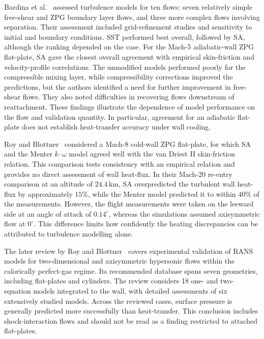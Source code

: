 Bardina et al.~\cite{bardina1997turbulence} assessed turbulence models for ten flows: seven relatively simple free-shear and ZPG boundary layer flows, and three more complex flows involving separation. Their assessment included grid-refinement studies and sensitivity to initial and boundary conditions. SST performed best overall, followed by SA, although the ranking depended on the case. For the Mach-5 adiabatic-wall ZPG flat-plate, SA gave the closest overall agreement with empirical skin-friction and velocity-profile correlations. The unmodified models performed poorly for the compressible mixing layer, while compressibility corrections improved the predictions, but the authors identified a need for further improvement in free-shear flows. They also noted difficulties in recovering flows downstream of reattachment. These findings illustrate the dependence of model performance on the flow and validation quantity. In particular, agreement for an adiabatic flat-plate does not establish heat-transfer accuracy under wall cooling.
\par\medskip

Roy and Blottner~\cite{roy2001assessment} considered a Mach-8 cold-wall ZPG flat-plate, for which SA and the Menter \(k\)--\(\omega\) model agreed well with the van Driest II skin-friction relation. This comparison tests consistency with an empirical relation and provides no direct assessment of wall heat-flux. In their Mach-20 re-entry comparison at an altitude of \(24.4\,\mathrm{km}\), SA overpredicted the turbulent wall heat-flux by approximately \(15\%\), while the Menter model predicted it to within \(40\%\) of the measurements. However, the flight measurements were taken on the leeward side at an angle of attack of \(0.14^\circ\), whereas the simulations assumed axisymmetric flow at \(0^\circ\). This difference limits how confidently the heating discrepancies can be attributed to turbulence modelling alone.
\par\medskip

The later review by Roy and Blottner~\cite{roy2006review} covers experimental validation of RANS models for two-dimensional and axisymmetric hypersonic flows within the calorically perfect-gas regime. Its recommended database spans seven geometries, including flat-plates and cylinders. The review considers 18 one- and two-equation models integrated to the wall, with detailed assessments of six extensively studied models. Across the reviewed cases, surface pressure is generally predicted more successfully than heat-transfer. This conclusion includes shock-interaction flows and should not be read as a finding restricted to attached flat-plates.


